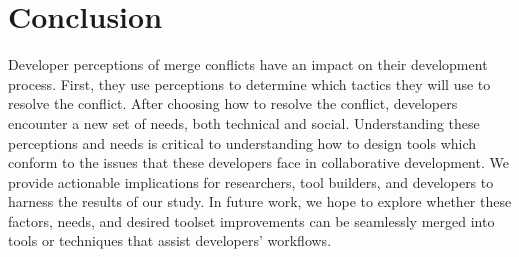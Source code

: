 \section{Conclusion}\label{conclusion}
Developer perceptions of merge conflicts have an impact on their development process. First, they use perceptions to determine which tactics they will use to resolve the conflict.
After choosing how to resolve the conflict, developers encounter a new set of needs, both technical and social. 
Understanding these perceptions and needs is critical to understanding how to design tools which conform to the issues that these developers face in collaborative development.
We provide actionable implications for researchers, tool builders, and developers to harness the results of our study.
In future work, we hope to explore whether these factors, needs, and desired toolset improvements can be seamlessly merged into tools or techniques that assist developers' workflows.

%
%
